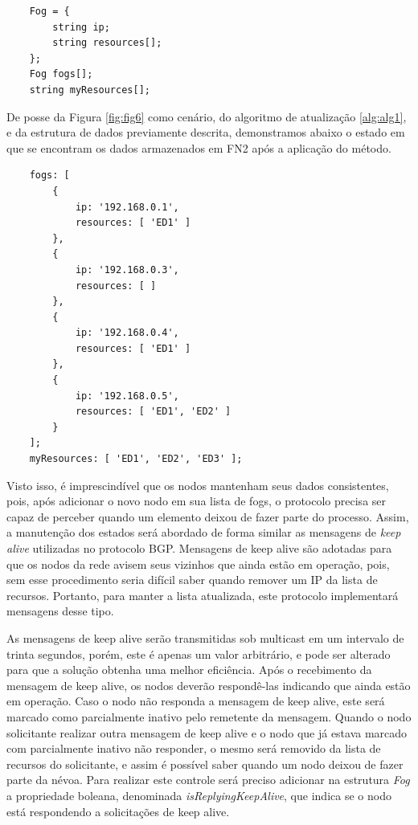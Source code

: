 \begin{verbatim}
    Fog = {
        string ip;
        string resources[];    
    };
    Fog fogs[];
    string myResources[];
\end{verbatim}

De posse da Figura \ref{fig:fig6} como cenário, do algoritmo de atualização \ref{alg:alg1}, e da estrutura de dados previamente descrita,
demonstramos abaixo o estado em que se encontram os dados armazenados em FN2 após a aplicação do método.

\begin{verbatim}
    fogs: [
        {
            ip: '192.168.0.1',
            resources: [ 'ED1' ]
        },
        {
            ip: '192.168.0.3',
            resources: [ ]
        },
        {
            ip: '192.168.0.4',
            resources: [ 'ED1' ]
        },
        {
            ip: '192.168.0.5',
            resources: [ 'ED1', 'ED2' ]
        }
    ];
    myResources: [ 'ED1', 'ED2', 'ED3' ];
\end{verbatim}

Visto isso, é imprescindível que os nodos mantenham seus dados consistentes, pois, após adicionar o novo nodo em sua lista de fogs, o protocolo precisa ser capaz de perceber quando um elemento
deixou de fazer parte do processo. Assim, a manutenção dos estados será abordado de forma similar as mensagens de \textit{keep alive} utilizadas no protocolo BGP.
Mensagens de keep alive são adotadas para que os nodos da rede avisem seus vizinhos que ainda estão em operação, pois, sem esse procedimento seria difícil
saber quando remover um IP da lista de recursos. Portanto, para manter a lista atualizada, este protocolo implementará mensagens desse tipo.

As mensagens de keep alive serão transmitidas sob multicast em um intervalo de trinta segundos, porém, este é apenas um valor arbitrário, e pode ser alterado
para que a solução obtenha uma melhor eficiência.
Após o recebimento da mensagem de keep alive, os nodos deverão respondê-las indicando que ainda estão em operação.
Caso o nodo não responda a mensagem de keep alive, este será marcado como parcialmente inativo pelo remetente da mensagem.
Quando o nodo solicitante realizar outra mensagem de keep alive e o nodo que já estava marcado com parcialmente inativo não responder, o mesmo será removido da lista de recursos do
solicitante, e assim é possível saber quando um nodo deixou de fazer parte da névoa.
Para realizar este controle será preciso adicionar na estrutura \textit{Fog} a propriedade boleana, denominada \textit{isReplyingKeepAlive}, que indica se o nodo está respondendo a solicitações de keep alive.

